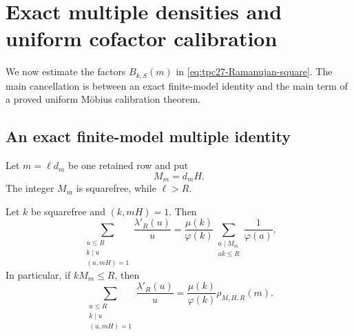 \section{Exact multiple densities and uniform cofactor calibration}
\label{sec:tpc27-multiple-calibration}

We now estimate the factors \(B_{k,S}(m)\) in
\eqref{eq:tpc27-Ramanujan-square}.  The main cancellation is between an
exact finite-model identity and the main term of a proved uniform
M\"obius calibration theorem.

\subsection{An exact finite-model multiple identity}

Let \(m=\ell d_m\) be one retained row and put
\begin{equation}
 M_m=d_mH.
 \label{eq:tpc27-Mm}
\end{equation}
The integer \(M_m\) is squarefree, while \(\ell>R\).

\begin{proposition}
\label{prop:tpc27-model-multiple}
Let \(k\) be squarefree and \((k,mH)=1\).  Then
\begin{equation}
 \boxed{
 \sum_{\substack{u\le R\\k\mid u\\(u,mH)=1}}
 \frac{\lambda'_R(u)}u
 =\frac{\mu(k)}{\varphi(k)}
 \sum_{\substack{a\mid M_m\\ak\le R}}
 \frac1{\varphi(a)}.}
 \label{eq:tpc27-truncated-model-multiple}
\end{equation}
In particular, if \(kM_m\le R\), then
\begin{equation}
 \boxed{
 \sum_{\substack{u\le R\\k\mid u\\(u,mH)=1}}
 \frac{\lambda'_R(u)}u
 =\frac{\mu(k)}{\varphi(k)}
 \rho_{M,H,R}(m).}
 \label{eq:tpc27-model-multiple}
\end{equation}
\end{proposition}

